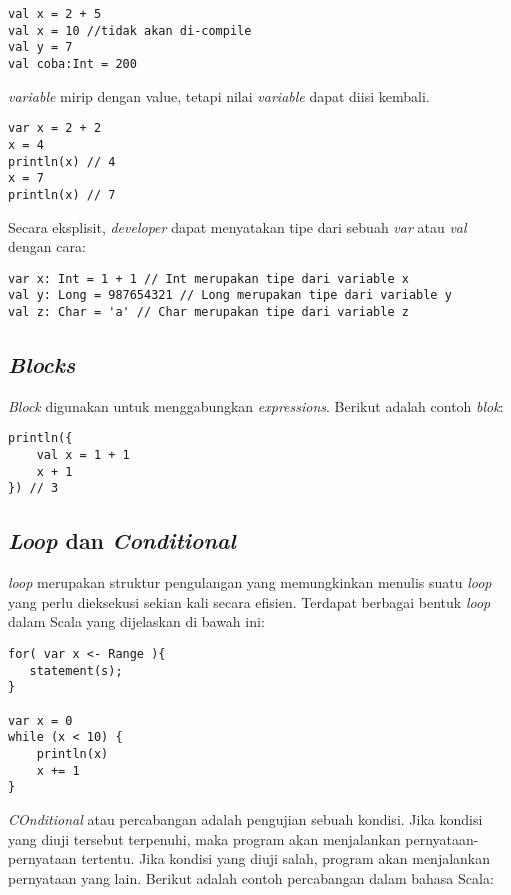 \begin{verbatim}
val x = 2 + 5
val x = 10 //tidak akan di-compile 
val y = 7
val coba:Int = 200 
\end{verbatim}

\textit{variable} mirip dengan value, tetapi nilai \textit{variable} dapat diisi kembali.

\begin{verbatim}
var x = 2 + 2 
x = 4 
println(x) // 4 
x = 7 
println(x) // 7 
\end{verbatim}

Secara eksplisit, \textit{developer} dapat menyatakan tipe dari sebuah \textit{var} atau \textit{val} dengan cara:

\begin{verbatim}
var x: Int = 1 + 1 // Int merupakan tipe dari variable x
val y: Long = 987654321 // Long merupakan tipe dari variable y
val z: Char = 'a' // Char merupakan tipe dari variable z
\end{verbatim}

\subsection{\textit{Blocks}}

\textit{Block} digunakan untuk menggabungkan \textit{expressions}. Berikut adalah contoh \textit{blok}:

\begin{verbatim}
println({
    val x = 1 + 1
    x + 1
}) // 3 
\end{verbatim}

\subsection{\textit{Loop} dan \textit{Conditional}}

\textit{loop} merupakan struktur pengulangan yang memungkinkan menulis suatu \textit{loop} yang perlu dieksekusi sekian kali secara efisien. Terdapat berbagai bentuk \textit{loop} dalam Scala yang dijelaskan di bawah ini: 

\begin{verbatim}
for( var x <- Range ){
   statement(s);
}

var x = 0
while (x < 10) {
    println(x)
    x += 1
}
\end{verbatim}

\textit{COnditional} atau percabangan adalah pengujian sebuah kondisi. Jika kondisi yang diuji tersebut terpenuhi, maka program akan menjalankan pernyataan-pernyataan tertentu. Jika kondisi yang diuji salah, program akan menjalankan pernyataan yang lain. Berikut adalah contoh percabangan dalam bahasa Scala:

